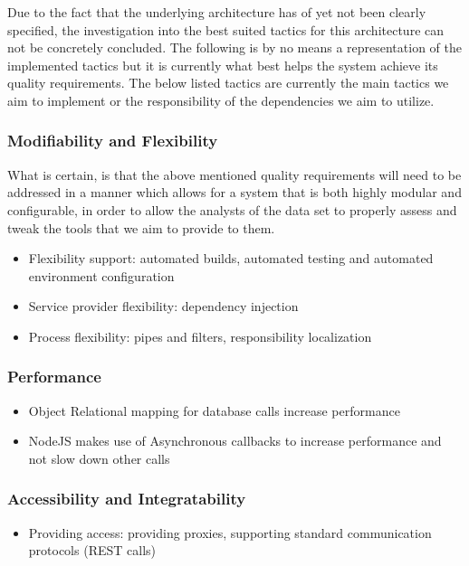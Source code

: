 \documentclass{article}
\begin{document}
	Due to the fact that the underlying architecture has of yet not been clearly specified, the investigation into the best suited tactics for this architecture can not be concretely concluded. The following is by no means a representation of the implemented tactics but it is currently what best helps the system achieve its quality requirements. The below listed tactics are currently the main tactics we aim to implement or the responsibility of the dependencies we aim to utilize.

		\subsubsection{Modifiability and Flexibility}\label{subsec:modifi}
		What is certain, is that the above mentioned quality requirements will need to be addressed in a manner which allows for a system that is both highly modular and configurable, in order to allow the analysts of the data set to properly assess and tweak the tools that we aim to provide to them.

		\begin{itemize}
			\item Flexibility support: automated builds, automated testing and automated environment configuration
			\item Service provider flexibility: dependency injection
			\item Process flexibility: pipes and filters, responsibility localization
		\end{itemize}
		\subsubsection{Performance}\label{subsec:performancetactic}
		\begin{itemize}
		\item Object Relational mapping for database calls increase performance
		\item NodeJS makes use of Asynchronous callbacks to increase performance and not slow down other calls 
		\end{itemize}
		\subsubsection{Accessibility and Integratability}\label{subsec:accesib}
		\begin{itemize}
			\item Providing access: providing proxies, supporting standard communication protocols (REST calls)
		\end{itemize}
\end{document}
